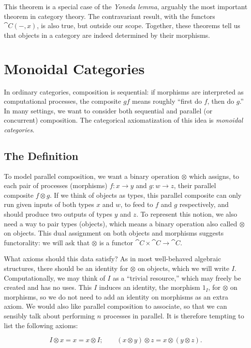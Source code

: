 This theorem is a special case of the \emph{Yoneda lemma}, arguably the most
important theorem in category theory. The contravariant result, with the
functors $\cat{C}(-, x)$, is also true, but outside our scope. Together, these
theorems tell us that objects in a category are indeed determined by their
morphisms.

\section{Monoidal Categories}

In ordinary categories, composition is sequential: if morphisms are interpreted
as computational processes, the composite $gf$ means roughly ``first do $f$,
then do $g$.'' In many settings, we want to consider both sequential and
parallel (or concurrent) composition. The categorical axiomatization of this idea is
\emph{monoidal categories}.

\subsection{The Definition}
\label{sec:monoidal definition}

To model parallel composition, we want a binary operation $\otimes$ which
assigns, to each pair of processes (morphisms) $f:x\to y$ and $g:w\to z$, their
parallel composite $f\otimes g$. If we think of objects as types, this parallel
composite can only run given inputs of both types $x$ and $w$, to feed to $f$
and $g$ respectively, and should produce two outputs of types $y$ and $z$. To
represent this notion, we also need a way to pair types (objects), which means a
binary operation also called $\otimes$ on objects. This dual assignment on
both objects and morphisms suggests functorality: we will ask that $\otimes$ is
a functor $\cat{C}\times\cat{C}\to\cat{C}$.

What axioms should this data satisfy? As in most well-behaved algebraic
structures, there should be an identity for $\otimes$ on objects, which we will
write $I$. Computationally, we may think of $I$ as a ``trivial resource,'' which
may freely be created and has no uses. This $I$ induces an identity, the
morphism $1_I$, for $\otimes$ on morphisms, so we do not need to add an identity
on morphisms as an extra axiom. We would also like parallel composition to
associate, so that we can sensibly talk about performing $n$ processes in
parallel. It is therefore tempting to list the following axioms:

\[
  I\otimes x = x = x\otimes I; \quad\quad (x\otimes y)\otimes z =
  x\otimes(y\otimes z).
\]

